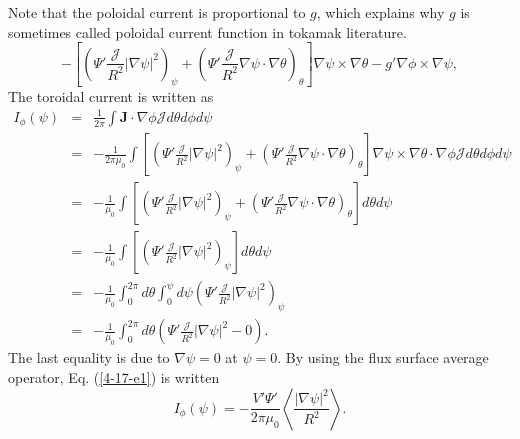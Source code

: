 \documentclass{llncs}
\begin{document}
Note that the poloidal current is proportional to $g$, which explains why $g$
is sometimes called poloidal current function in tokamak literature.
\[ - \left[ \left( \Psi' \frac{\mathcal{J}}{R^2} | \nabla \psi |^2
   \right)_{\psi} + \left( \Psi' \frac{\mathcal{J}}{R^2} \nabla \psi \cdot
   \nabla \theta \right)_{\theta} \right] \nabla \psi \times \nabla \theta -
   g' \nabla \phi \times \nabla \psi, \]
The toroidal current is written as
\begin{eqnarray}
  I_{\phi} (\psi) & = & \frac{1}{2 \pi} \int \mathbf{J} \cdot \nabla \phi
  \mathcal{J}d \theta d \phi d \psi \nonumber\\
  & = & - \frac{1}{2 \pi \mu_0} \int \left[ \left( \Psi'
  \frac{\mathcal{J}}{R^2} | \nabla \psi |^2 \right)_{\psi} + \left( \Psi'
  \frac{\mathcal{J}}{R^2} \nabla \psi \cdot \nabla \theta \right)_{\theta}
  \right] \nabla \psi \times \nabla \theta \cdot \nabla \phi \mathcal{J}d
  \theta d \phi d \psi \nonumber\\
  & = & - \frac{1}{\mu_0} \int \left[ \left( \Psi' \frac{\mathcal{J}}{R^2} |
  \nabla \psi |^2 \right)_{\psi} + \left( \Psi' \frac{\mathcal{J}}{R^2} \nabla
  \psi \cdot \nabla \theta \right)_{\theta} \right] d \theta d \psi
  \nonumber\\
  & = & - \frac{1}{\mu_0} \int \left[ \left( \Psi' \frac{\mathcal{J}}{R^2} |
  \nabla \psi |^2 \right)_{\psi} \right] d \theta d \psi \nonumber\\
  & = & - \frac{1}{\mu_0} \int_0^{2 \pi} d \theta \int_0^{\psi} d \psi \left(
  \Psi' \frac{\mathcal{J}}{R^2} | \nabla \psi |^2 \right)_{\psi} \nonumber\\
  & = & - \frac{1}{\mu_0} \int_0^{2 \pi} d \theta \left( \Psi'
  \frac{\mathcal{J}}{R^2} | \nabla \psi |^2 - 0 \right) .  \label{4-17-e1}
\end{eqnarray}
The last equality is due to $\nabla \psi = 0$ at $\psi = 0$. By using the flux
surface average operator, Eq. (\ref{4-17-e1}) is written
\begin{equation}
  I_{\phi} (\psi) = - \frac{V' \Psi'}{2 \pi \mu_0} \left\langle \frac{| \nabla
  \psi |^2}{R^2} \right\rangle .
\end{equation}
\end{document}
